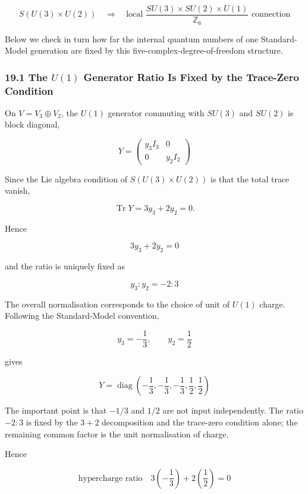 \documentclass[
  a4paper,
]{article}
\begin{document}
\[
\boxed{
S(U(3)\times U(2))
\quad\Longrightarrow\quad
\text{local }
\frac{SU(3)\times SU(2)\times U(1)}{\mathbb Z_6}
\text{ connection}
}
\tag{98}
\]

Below we check in turn how far the internal quantum numbers of one
Standard-Model generation are fixed by this
five-complex-degree-of-freedom structure.

\subsubsection{\texorpdfstring{19.1 The \(U(1)\) Generator Ratio Is
Fixed by the Trace-Zero
Condition}{19.1 The U(1) Generator Ratio Is Fixed by the Trace-Zero Condition}}\label{the-u1-generator-ratio-is-fixed-by-the-trace-zero-condition}

On \(V=V_3\oplus V_2\), the \(U(1)\) generator commuting with \(SU(3)\)
and \(SU(2)\) is block diagonal,

\[
Y
=
\begin{pmatrix}
y_3 I_3 & 0\\
0 & y_2 I_2
\end{pmatrix}
\tag{99}
\]

Since the Lie algebra condition of \(S(U(3)\times U(2))\) is that the
total trace vanish,

\[
\operatorname{Tr}Y
=
3y_3+2y_2
=
0.
\tag{100}
\]

Hence

\[
\boxed{
3y_3+2y_2=0
}
\tag{101}
\]

and the ratio is uniquely fixed as

\[
\boxed{
y_3:y_2=-2:3
}
\tag{102}
\]

The overall normalisation corresponds to the choice of unit of \(U(1)\)
charge. Following the Standard-Model convention,

\[
\boxed{
y_3=-\frac13,
\qquad
y_2=\frac12
}
\tag{103}
\]

gives

\[
\boxed{
Y
=
\operatorname{diag}
\left(
-\frac13,-\frac13,-\frac13,
\frac12,\frac12
\right)
}
\tag{104}
\]

The important point is that \(-1/3\) and \(1/2\) are not input
independently. The ratio \(-2:3\) is fixed by the \(3+2\) decomposition
and the trace-zero condition alone; the remaining common factor is the
unit normalisation of charge.

Hence

\[
\boxed{
\text{hypercharge ratio}
\quad
3\left(-\frac13\right)
+
2\left(\frac12\right)
=0
}
\tag{105}
\]
\end{document}
